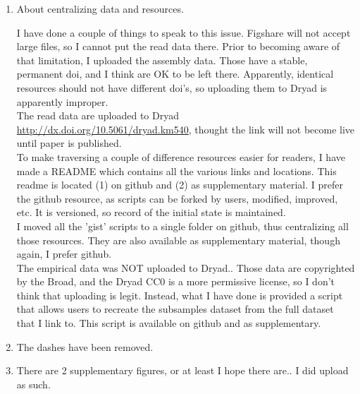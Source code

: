 \documentclass[11pt]{article}
\begin{document}
\begin{enumerate}

\item About centralizing data and resources.

\begin{addmargin}[2em]{2em}
I have done a couple of things to speak to this issue. Figshare will not accept large files, so I cannot put the read data there. Prior to becoming aware of that limitation, I uploaded the assembly data. Those have a stable, permanent doi, and I think are OK to be left there. Apparently, identical resources should not have different doi's, so uploading them to Dryad is apparently improper.  \\

\noindent
The read data are uploaded to Dryad \url{http://dx.doi.org/10.5061/dryad.km540}, thought the link will not become live until paper is published.\\

\noindent
To make traversing a couple of difference resources easier for readers, I have made a README which contains all the various links and locations.  This readme is located (1) on github and (2) as supplementary material. I prefer the github resource, as scripts can be forked by users, modified, improved, etc. It is versioned, so record of the initial state is maintained. \\

\noindent
I moved all the 'gist' scripts to a single folder on github, thus centralizing all those resources. They are also available as supplementary material, though again, I prefer github. \\

\noindent
The empirical data was NOT uploaded to Dryad.. Those data are copyrighted by the Broad, and the Dryad CC0 is a more permissive license, so I don't think that uploading is legit.  Instead, what I have done is provided a script that allows users to recreate the subsamples dataset from the full dataset that I link to. This script is available on github and as supplementary. 

\end{addmargin}



\item The dashes have been removed. 

\item There are 2 supplementary figures, or at least I hope there are.. I did upload as such. 


\end{enumerate}
\end{document}

